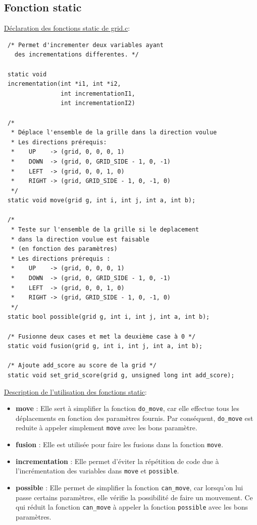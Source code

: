 \documentclass[a4paper]{article}
\begin{document}
 \subsection{Fonction static}
 \label{sec-3-2}
 \noindent
 \underline{Déclaration des fonctions static de grid.c}:
 \begin{verbatim}
 /* Permet d'incrementer deux variables ayant 
   des incrementations differentes. */

 static void 
 incrementation(int *i1, int *i2, 
                int incrementationI1, 
                int incrementationI2)

 /*
  * Déplace l'ensemble de la grille dans la direction voulue 
  * Les directions prérequis: 
  *    UP    -> (grid, 0, 0, 0, 1)
  *    DOWN  -> (grid, 0, GRID_SIDE - 1, 0, -1)
  *    LEFT  -> (grid, 0, 0, 1, 0)
  *    RIGHT -> (grid, GRID_SIDE - 1, 0, -1, 0)
  */
 static void move(grid g, int i, int j, int a, int b);

 /*
  * Teste sur l'ensemble de la grille si le deplacement
  * dans la direction voulue est faisable
  * (en fonction des paramètres) 
  * Les directions prérequis :  
  *    UP    -> (grid, 0, 0, 0, 1)
  *    DOWN  -> (grid, 0, GRID_SIDE - 1, 0, -1)
  *    LEFT  -> (grid, 0, 0, 1, 0)
  *    RIGHT -> (grid, GRID_SIDE - 1, 0, -1, 0)
  */
 static bool possible(grid g, int i, int j, int a, int b);

 /* Fusionne deux cases et met la deuxième case à 0 */
 static void fusion(grid g, int i, int j, int a, int b);

 /* Ajoute add_score au score de la grid */
 static void set_grid_score(grid g, unsigned long int add_score);
 \end{verbatim}

 \bigskip
 \underline{Description de l'utilisation des fonctions static}: 
 \begin{itemize}
 \item \textbf{move} :
 Elle sert à simplifier la fonction \texttt{do\_move}, car elle effectue tous 
 les déplacements en fonction des paramètres fournis. Par conséquent,
 \texttt{do\_move} est reduite à appeler simplement \texttt{move} avec les bons paramètre.
 \item \textbf{fusion} :
 Elle est utilisée pour faire les fusions dans la fonction \texttt{move}.
 \item \textbf{incrementation} :
 Elle permet d'éviter la répétition de code due à l'incrémentation des
 variables dans \texttt{move} et \texttt{possible}.
 \item \textbf{possible} : 
 Elle permet de simplifier la fonction \texttt{can\_move}, car lorsqu'on lui passe
 certains paramètres, elle vérifie la possibilité de faire un
 mouvement. Ce qui réduit la fonction \texttt{can\_move} à appeler la
 fonction \texttt{possible} avec les bons paramètres.
 \end{itemize}
 \newpage
\end{document}
